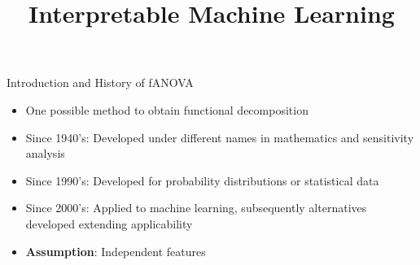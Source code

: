 \documentclass[10pt,compress,t,notes=noshow, xcolor=table]{beamer}
\title{Interpretable Machine Learning}
\date{}
\begin{document}


\begin{frame}{Introduction and History of fANOVA}

\begin{itemize}
    \item One possible method to obtain functional decomposition
    \item Since 1940's: Developed under different names in mathematics and sensitivity analysis
    \item Since 1990's: Developed for probability distributions or statistical data
    \item Since 2000's: Applied to machine learning, subsequently alternatives developed extending applicability
    \item \textbf{Assumption}: Independent features
\end{itemize}




    
\end{frame}
\end{document}
